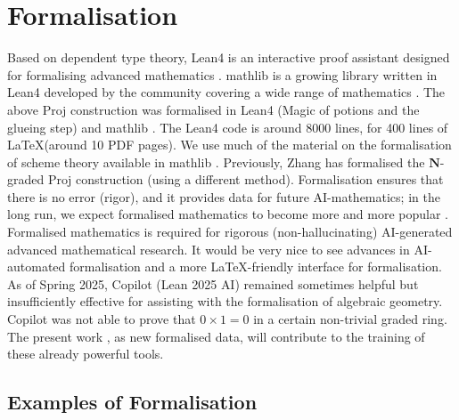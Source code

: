 \documentclass[graybox]{svmult}
\begin{document}
\section{Formalisation}


Based on dependent type theory, Lean4 is an interactive proof assistant designed for formalising advanced mathematics \cite{dMal15, dMU21}.
mathlib is a growing library written in Lean4 developed by the community covering a wide range of mathematics \cite{Mathlib}.
The above Proj construction was formalised in Lean4 (Magic of potions and the glueing step) and mathlib \cite{MZ25}. 
The Lean4 code is around 8000 lines, for 400 lines of \LaTeX  (around 10 PDF pages).
We use much of the material on the formalisation of scheme theory available in mathlib \cite{Bual22, WZ22}.
Previously, Zhang has formalised the $\mathbf{N}$-graded $\mathrm{Proj}$ construction \cite{Z23} (using a different method).
Formalisation ensures that there is no error (rigor), and it provides data for future AI-mathematics; in the long run, we expect formalised mathematics to become more and more popular \cite{Av24, Bu24}. Formalised mathematics is required for rigorous (non-hallucinating) AI-generated advanced mathematical research. It would be very nice to see advances in AI-automated formalisation and a more \LaTeX-friendly interface for formalisation.
As of Spring 2025, Copilot (Lean 2025 AI) remained sometimes helpful but insufficiently effective for assisting with the formalisation of algebraic geometry. Copilot was not able to prove that $0 \times 1 = 0$ in a certain non-trivial graded ring. The present work \cite{MZ25}, as new formalised data, will contribute to the training of these already powerful tools.

\subsection{Examples of Formalisation} 
\end{document}
